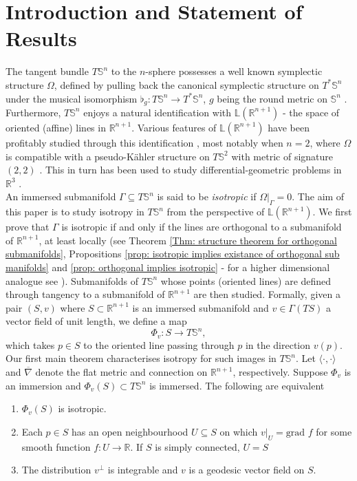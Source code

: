 \documentclass[12pt]{amsart}
\theoremstyle{plain}
\newenvironment{Mainthm}[1]{%
  \IfBlankTF{#1}
    {\renewcommand{\theMainthminner}{\unskip}}
    {\renewcommand\theMainthminner{#1}}%
  \Mainthminner
}{\endMainthminner}
\theoremstyle{definition}
\def\R{\mathbb{R}}
\def\S{\mathbb{S}}
\numberwithin{equation}{section}
\begin{document}
\section{Introduction and Statement of Results}
 The tangent bundle $T\S^n$ to the $n$-sphere possesses a well known symplectic structure $\Omega$, defined by pulling back the canonical symplectic structure on $T^\ast\S^n$ under the musical isomorphism $\flat_g:T\S^n\to T^\ast \S^n$, $g$ being the round metric on $\S^n$ \cite{GG22}. Furthermore, $T\S^n$ enjoys a natural identification with  $\mathbb{L}(\mathbb{R}^{n+1})$ - the space of oriented (affine) lines in $\R^{n+1}$. Various features of $\mathbb{L}(\R^{n+1})$ have been profitably studied through this identification \cite{Dun} \cite{Har16} \cite{S05}, most notably when $n=2$, where $\Omega$ is compatible with a pseudo-K\"ahler structure on $T\S^2$ with metric of signature $(2,2)$ \cite{GK}.
This in turn has been used to study differential-geometric problems in $\R^3$ \cite{GK2} \cite{GK3}. 
\\

An immersed submanifold $\Gamma\subseteq T\mathbb{S}^n$ is said to be \textit{isotropic} if $\Omega|_{\Gamma}=0$. The aim of this paper is to study isotropy in $T\S^n$ from the perspective of $\mathbb{L}(\R^{n+1})$. We first prove that $\Gamma$ is isotropic if and only if the lines are orthogonal to a submanifold of $\R^{n+1}$, at least locally (see Theorem \ref{Thm: structure theorem for orthogonal submanifolds}, Propositions \ref{prop: isotropic implies existance of orthogonal sub manifolds} and \ref{prop: orthogonal implies isotropic} - for a higher dimensional analogue see \cite{AB18}). Submanifolds of $T\S^n$ whose points (oriented lines) are defined through tangency to a submanifold of $\R^{n+1}$ are then studied. Formally, given a pair $(S,v)$ where $S\subset\R^{n+1}$ is an immersed submanifold and $v\in\Gamma(TS)$ a vector field of unit length, we define a map 
\begin{equation}\label{eq: map phi in intro}
\Phi_v:S\to T\S^n,
\end{equation}
which takes $p\in S$ to the oriented line passing through $p$ in the direction $v(p)$. Our first main theorem characterises isotropy for such images in $T\S^n$. Let $\langle\cdot,\cdot\rangle$ and $\overline{\nabla}$ denote the flat metric and connection on $\R^{n+1}$, respectively.
\begin{Mainthm}{1}\label{mainthm1}
Suppose $\Phi_v$ is an immersion and $\Phi_v(S)\subset T\S^n$ is immersed. The following are equivalent    \begin{enumerate}[label=(\alph*), itemsep=4pt, topsep=3pt]
        \item $\Phi_v(S)$ is isotropic.
        \item Each $p\in S$ has an open neighbourhood $U\subseteq S$ on which $v|_U=\mbox{grad~}f$ for some smooth function $f:U\to \mathbb{R}$. If $S$ is simply connected, $U=S$
        \item The distribution $v^\perp$ is integrable and $v$ is a geodesic vector field on $S$.
    \end{enumerate}
\end{Mainthm}
\end{document}
